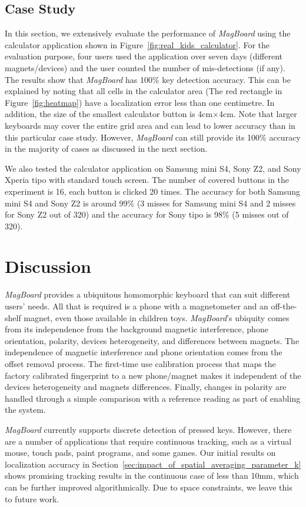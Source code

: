 \documentclass[conference]{IEEEtran}
\def \sys {\textit{MagBoard}}
\begin{document}
\subsection{Case Study}
\label{sec:case_study}
In this section, we extensively evaluate the performance of \sys{} using the calculator application shown in Figure~\ref{fig:real_kids_calculator}. For the evaluation purpose, four users used the application over seven days (different magnets/devices) and the user counted the number of mis-detections (if any). 
The results show that \sys{} has 100\% key detection accuracy. This can be explained by noting that all cells in the calculator area (The red rectangle in Figure~\ref{fig:heatmap}) have a localization error less than one centimetre. In addition, the size of the smallest calculator button is 4cm$\times$4cm. Note that larger keyboards may cover the entire grid area and can lead to lower accuracy than in this particular case study. However, \sys{} can still provide its 100\% accuracy in the majority of cases as discussed in the next section.

We also tested the calculator application on Samsung mini S4, Sony Z2, and Sony Xperia tipo with standard touch screen. The number of covered buttons in the experiment is 16, each button is clicked 20 times. The accuracy for both Samsung mini S4 and Sony Z2 is around 99\% (3 misses for Samsung mini S4 and 2 misses for Sony Z2 out of 320) and the accuracy for Sony tipo is 98\% (5 misses out of 320).

\section{Discussion}
\label{sec:discussion}
\sys{} provides a ubiquitous homomorphic keyboard that can suit different users' needs. All that is required is a phone with a magnetometer and an off-the-shelf magnet, even those available in children toys. \sys{}'s ubiquity comes from its independence from the background magnetic interference, phone orientation, polarity, devices heterogeneity, and differences between magnets. The independence of magnetic interference and phone orientation comes from the offset removal process. The first-time use calibration process that maps the factory calibrated fingerprint to a new phone/magnet makes it independent of the devices heterogeneity and magnets differences. Finally, changes in polarity are handled through a simple comparison with a reference reading as part of enabling the system.

\sys{} currently supports discrete detection of pressed keys. However, there are a number of applications that require continuous tracking, such as a virtual mouse, touch pads, paint programs, and some games. Our initial results on localization accuracy in Section~\ref{sec:impact_of_spatial_averaging_parameter_k} shows promising tracking results in the continuous case of less than 10mm, which can be further improved algorithmically. Due to space constraints, we leave this to future work.
\end{document}
